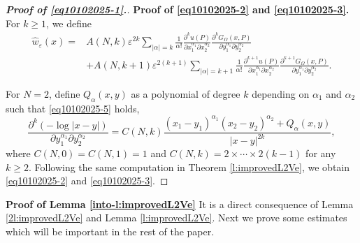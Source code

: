\documentclass[11pt,reqno]{article}
\numberwithin{equation}{section}
\newcommand\e\varepsilon
\begin{document}
\begin{proof}[\bf Proof of \eqref{eq10102025-1}.]
{\bf Proof of \eqref{eq10102025-2} and \eqref{eq10102025-3}.}\\
For $k\ge1$, we define 
  \begin{equation}
				\begin{aligned}
					\hat{w}_\e(x)=&A(N,k)\e^{2k}	\sum_{|\alpha|=k}\frac1{\alpha!}
					\frac{\partial^ku(P)}{\partial x_1^{\alpha_1}\partial x_2^{\alpha_2}}
					\frac{\partial^kG_{\Omega}(x,P)}{\partial y_1^{\alpha_1}\partial y_2^{\alpha_2}}\\
					&+A(N,k+1)\e^{2(k+1)}	\sum_{|\alpha|=k+1}\frac1{\alpha!}
					\frac{\partial^{k+1}u(P)}{\partial x_1^{\alpha_1}\partial x_2^{\alpha_2}}
					\frac{\partial^{k+1}G_{\Omega}(x,P)}{\partial y_1^{\alpha_1}\partial y_2^{\alpha_2}}.
				\end{aligned}      
            \end{equation}

                   For $N=2$, define $Q_\alpha(x,y)$ as a polynomial of degree $k$ depending  on $\alpha_1$ and $\alpha_2$ such that \eqref{eq10102025-5} holds,
                    \begin{equation}\label{eq10102025-5}
                        \frac{\partial^k(-\log|x-y|)}{\partial y_1^{\alpha_1}\partial y_2^{\alpha_2}} = C(N,k)\frac{(x_1 - y_1)^{\alpha_1}(x_2 - y_2)^{\alpha_2}+Q_\alpha(x,y)}{|x - y|^{2k}},
                    \end{equation}
                    where $C(N,0)=C(N,1)=1$ and $C(N,k)=2\times\cdots\times2(k-1)$ for any $k\ge 2$.
                   Following  the same computation in Theorem \ref{l:improvedL2Ve}, we obtain \eqref{eq10102025-2} and \eqref{eq10102025-3}. 
	\end{proof}
	{\bf Proof of Lemma \ref{into-l:improvedL2Ve}} It is a direct consequence of Lemma \ref{2l:improvedL2Ve} and Lemma \ref{l:improvedL2Ve}.
\vskip0.2cm\noindent
Next we prove some estimates which will be important in the rest of the paper.
		
\end{document}
